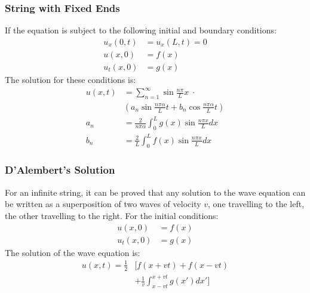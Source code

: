 \documentclass[a4paper]{article}
\begin{document}
\begin{multicols*}{2}
\subsubsection{String with Fixed Ends}
If the equation is subject to the following initial and boundary conditions:
\begin{align*}
  u_x(0, t) &= u_x(L, t) = 0 \\
  u(x, 0) &= f(x) \\
  u_t(x, 0) &= g(x)
\end{align*}
The solution for these conditions is:
\begin{align*}
  u(x, t) &= \sum_{n=1}^{\infty}\sin{\frac{n\pi}{L} x} \; \cdot \\
  &\left( a_n\sin{\frac{n \pi \alpha}{L} t}
    + b_n\cos{\frac{n \pi \alpha}{L} t} \right) \\
  a_n &= \frac{2}{n \pi \alpha}\int_0^L g(x)\sin\frac{n \pi x}{L} dx \\
  b_n &= \frac{2}{L}\int_0^L f(x)\sin\frac{n \pi x}{L} dx
\end{align*}
\subsubsection{D'Alembert's Solution}
For an infinite string, it can be proved that any solution to the wave equation
can be written as a superposition of two waves of velocity $v$, one travelling
to the left, the other travelling to the right. For the initial conditions:
\begin{align*}
  u(x, 0) &= f(x) \\
  u_t(x, 0) &= g(x)
\end{align*}
The solution of the wave equation is:
\begin{align*}
  u(x, t) = \frac{1}{2} &\bigg[ f(x+vt) + f(x-vt)  \\
  &+ \frac{1}{v}\int_{x-vt}^{x+vt}g(x') dx' \bigg]
\end{align*}

\end{multicols*}
\end{document}
